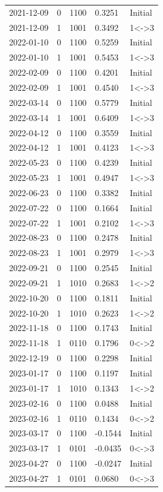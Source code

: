 \begin{footnotesize}
\begin{longtable}{lllll}
2021-12-09 & 0 & 1100 & 0.3251 & Initial \\
2021-12-09 & 1 & 1001 & 0.3492 & 1<->3 \\
2022-01-10 & 0 & 1100 & 0.5259 & Initial \\
2022-01-10 & 1 & 1001 & 0.5453 & 1<->3 \\
2022-02-09 & 0 & 1100 & 0.4201 & Initial \\
2022-02-09 & 1 & 1001 & 0.4540 & 1<->3 \\
2022-03-14 & 0 & 1100 & 0.5779 & Initial \\
2022-03-14 & 1 & 1001 & 0.6409 & 1<->3 \\
2022-04-12 & 0 & 1100 & 0.3559 & Initial \\
2022-04-12 & 1 & 1001 & 0.4123 & 1<->3 \\
2022-05-23 & 0 & 1100 & 0.4239 & Initial \\
2022-05-23 & 1 & 1001 & 0.4947 & 1<->3 \\
2022-06-23 & 0 & 1100 & 0.3382 & Initial \\
2022-07-22 & 0 & 1100 & 0.1664 & Initial \\
2022-07-22 & 1 & 1001 & 0.2102 & 1<->3 \\
2022-08-23 & 0 & 1100 & 0.2478 & Initial \\
2022-08-23 & 1 & 1001 & 0.2979 & 1<->3 \\
2022-09-21 & 0 & 1100 & 0.2545 & Initial \\
2022-09-21 & 1 & 1010 & 0.2683 & 1<->2 \\
2022-10-20 & 0 & 1100 & 0.1811 & Initial \\
2022-10-20 & 1 & 1010 & 0.2623 & 1<->2 \\
2022-11-18 & 0 & 1100 & 0.1743 & Initial \\
2022-11-18 & 1 & 0110 & 0.1796 & 0<->2 \\
2022-12-19 & 0 & 1100 & 0.2298 & Initial \\
2023-01-17 & 0 & 1100 & 0.1197 & Initial \\
2023-01-17 & 1 & 1010 & 0.1343 & 1<->2 \\
2023-02-16 & 0 & 1100 & 0.0488 & Initial \\
2023-02-16 & 1 & 0110 & 0.1434 & 0<->2 \\
2023-03-17 & 0 & 1100 & -0.1544 & Initial \\
2023-03-17 & 1 & 0101 & -0.0435 & 0<->3 \\
2023-04-27 & 0 & 1100 & -0.0247 & Initial \\
2023-04-27 & 1 & 0101 & 0.0680 & 0<->3 \\

\end{longtable}
\end{footnotesize}
